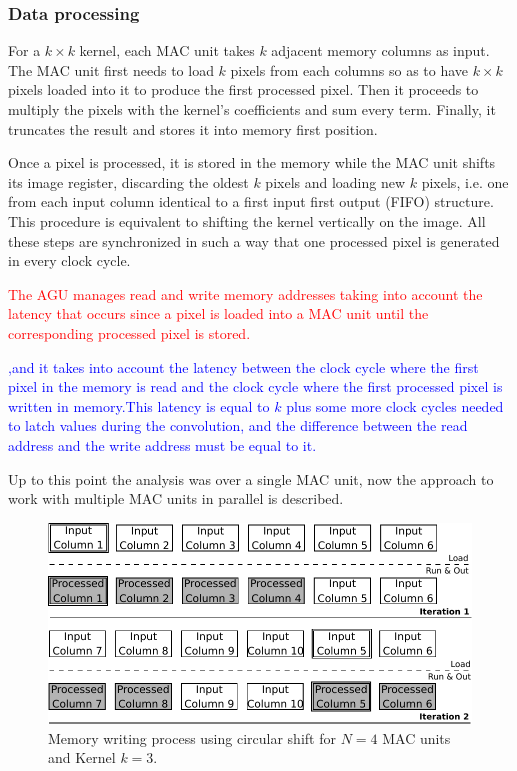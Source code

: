 \documentclass[conference,compsoc]{IEEEtran}
\begin{document}
\subsubsection{Data processing}\label{dataproc}
For a $k\times k$ kernel, each MAC unit takes $k$ adjacent memory columns as
input. The MAC unit first needs to load $k$ pixels from each columns so as to
have $k\times k$ pixels loaded into it to produce the first processed
pixel. Then it proceeds to multiply the pixels with the kernel's coefficients and
sum every term. Finally, it truncates the result and stores it into memory first position.

Once a pixel is processed, it is stored in the memory while the MAC unit shifts
its image register, discarding the oldest $k$ pixels and loading new $k$ pixels,
i.e. one from each input column identical to a first input first output (FIFO) structure.
This procedure is equivalent to shifting the kernel vertically on the image. All
these steps are synchronized in such a way that one processed pixel is generated
in every clock cycle.

\textcolor{red}{ The AGU manages read and write memory addresses taking into account the latency that occurs
since a pixel is loaded into a MAC unit until the corresponding processed pixel is stored.}


\textcolor{blue}{,and it takes into account the
latency between the clock cycle where the first pixel in the memory is read and
the clock cycle where the first processed pixel is written in memory.This latency is
equal to $k$ plus some more clock cycles needed to latch values during the
convolution, and the difference between the read address and the write address
must be equal to it.} 

Up to this point the analysis was over a single MAC unit, now the
approach to work with multiple MAC units in parallel is
described.

\begin{figure}[!t]
\centering
\includegraphics[scale=0.55]{algorithm}
\caption{Memory writing process using circular shift for $N = 4$ MAC units and
  Kernel $k = 3$.}
\label{algorithm}
\end{figure}
\end{document}
